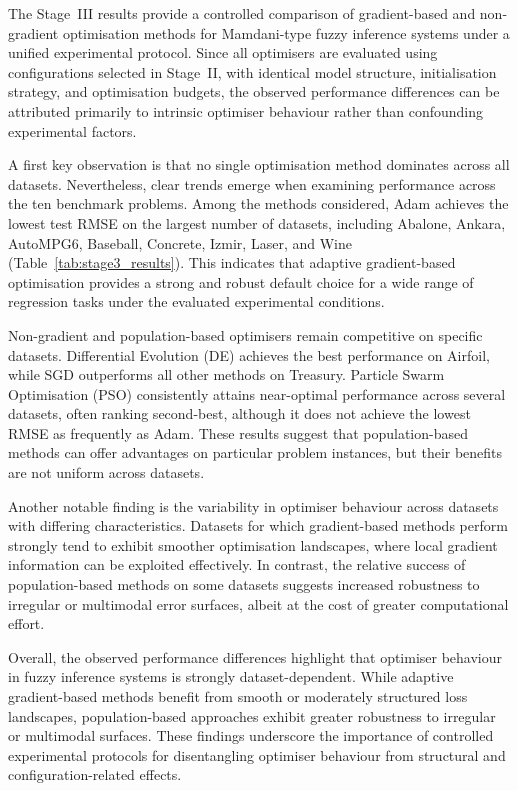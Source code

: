 \documentclass[a4paper,12pt,oneside]{article}
\begin{document}
The Stage~III results provide a controlled comparison of gradient-based and
non-gradient optimisation methods for Mamdani-type fuzzy inference systems under
a unified experimental protocol.
Since all optimisers are evaluated using configurations selected in Stage~II,
with identical model structure, initialisation strategy, and optimisation
budgets, the observed performance differences can be attributed primarily to
intrinsic optimiser behaviour rather than confounding experimental factors.

A first key observation is that no single optimisation method dominates across
all datasets.
Nevertheless, clear trends emerge when examining performance across the ten
benchmark problems.
Among the methods considered, Adam achieves the lowest test RMSE on the largest
number of datasets, including Abalone, Ankara, AutoMPG6, Baseball, Concrete,
Izmir, Laser, and Wine (Table~\ref{tab:stage3_results}).
This indicates that adaptive gradient-based optimisation provides a strong and
robust default choice for a wide range of regression tasks under the evaluated
experimental conditions.

Non-gradient and population-based optimisers remain competitive on specific
datasets.
Differential Evolution (DE) achieves the best performance on Airfoil, while SGD
outperforms all other methods on Treasury.
Particle Swarm Optimisation (PSO) consistently attains near-optimal performance
across several datasets, often ranking second-best, although it does not achieve
the lowest RMSE as frequently as Adam.
These results suggest that population-based methods can offer advantages on
particular problem instances, but their benefits are not uniform across
datasets.

Another notable finding is the variability in optimiser behaviour across
datasets with differing characteristics.
Datasets for which gradient-based methods perform strongly tend to exhibit
smoother optimisation landscapes, where local gradient information can be
exploited effectively.
In contrast, the relative success of population-based methods on some datasets
suggests increased robustness to irregular or multimodal error surfaces, albeit
at the cost of greater computational effort.

Overall, the observed performance differences highlight that optimiser behaviour
in fuzzy inference systems is strongly dataset-dependent.
While adaptive gradient-based methods benefit from smooth or moderately
structured loss landscapes, population-based approaches exhibit greater
robustness to irregular or multimodal surfaces.
These findings underscore the importance of controlled experimental protocols
for disentangling optimiser behaviour from structural and configuration-related
effects.
\end{document}
